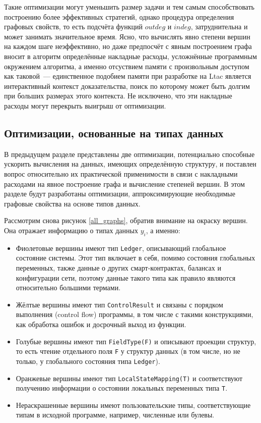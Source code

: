 \documentclass[../thesis.tex]{subfiles}
\begin{document}
Такие оптимизации могут уменьшить размер задачи и тем самым способствовать построению более эффективных стратегий, однако процедура определения графовых свойств, то есть подсчёта функций $outdeg$ и $indeg$, затруднительна и может занимать значительное время. Ясно, что вычислять явно степени вершин на каждом шаге неэффективно, но даже предпосчёт с явным построением графа вносит в алгоритм определённые накладные расходы, усложнённые программным окружением алгоритма, а именно отсуствием памяти с произвольным доступом как таковой~--- единственное подобием памяти при разработке на Ltac является интерактивный контекст доказательства, поиск по которому может быть долгим при больших размерах этого контекста. Не исключено, что эти накладные расходы могут перекрыть выигрыш от оптимизации.

\subsection{Оптимизации, основанные на типах данных}\label{typebased}

В предыдущем разделе представлены две оптимизации, потенциально способные ускорить вычисления на данных, имеющих определённую структуру, и поставлен вопрос относительно их практической применимости в связи с накладными расходами на явное построение графа и вычисление степеней вершин. В этом разделе будут разработаны оптимизации, аппроксимирующие необходимые графовые свойства на основе типов данных.

Рассмотрим снова рисунок \ref{all_graphs}, обратив внимание на окраску вершин. Она отражает информацию о типах данных $y_i$, а именно:

\begin{itemize}
    \item Фиолетовые вершины имеют тип \texttt{Ledger}, описывающий глобальное состояние системы. Этот тип включает в себя, помимо состояния глобальных переменных, также данные о других смарт-контрактах, балансах и конфигурации сети, поэтому данные такого типа как правило являются относительно большими термами.
    \item Жёлтые вершины имеют тип \texttt{ControlResult} и связаны с порядком выполнения (control flow) программы, в том числе с такими конструкциями, как обработка ошибок и досрочный выход из функции.
    \item Голубые вершины имеют тип \texttt{FieldType(F)} и описывают проекции структур, то есть чтение отдельного поля \texttt{F} у структур данных (в том числе, но не только, у глобального состояния типа \texttt{Ledger}).
    \item Оранжевые вершины имеют тип \texttt{LocalStateMapping(T)} и соответствуют получению информации о состоянии локальных переменных типа \texttt{T}.
    \item Нераскрашенные вершины имеют пользовательские типы, соответствующие типам в исходной программе, например, численные или булевы.
\end{itemize}
\end{document}
